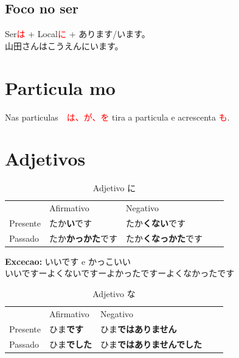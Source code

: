 \documentclass[a4paper, 12pt]{article}
\begin{document}
\subsection{Foco no ser}
\begin{CJK}{UTF8}{min}
	Ser\textcolor{red}{は} + Local\textcolor{red}{に} + あります/います。\\
	山田さんはこうえんにいます。 
\end{CJK}

\section{Particula mo}

\begin{CJK}{UTF8}{min}
	Nas particulas　\textcolor{red}{は、が、を} tira a particula e acrescenta \textcolor{red}{も}.
\end{CJK}

\section{Adjetivos}
\begin{CJK}{UTF8}{min}
	\begin{table}[h]
		\caption{Adjetivo に}
		\begin{tabular}{lllll}
			& Afirmativo & Negativo &   \\
			Presente & たか\textbf{い}です          & たか\textbf{くない}です         \\
			Passado  & たか\textbf{かっかた}です          & たか\textbf{くなっかた}です         \\

		\end{tabular}
	\end{table}
	\textbf{Excecao:} いいです e かっこいい\\いいですーよくないですーよかったですーよくなかったです
	
	\begin{table}[h]
		\caption{Adjetivo な}
		\begin{tabular}{lllll}
			& Afirmativo & Negativo &   \\
			Presente & ひま\textbf{です}          & ひま\textbf{ではありません}         \\
			Passado  & ひま\textbf{でした}          & ひま\textbf{ではありませんでした}         \\
			
		\end{tabular}
	\end{table}
\end{CJK}
\end{document}
